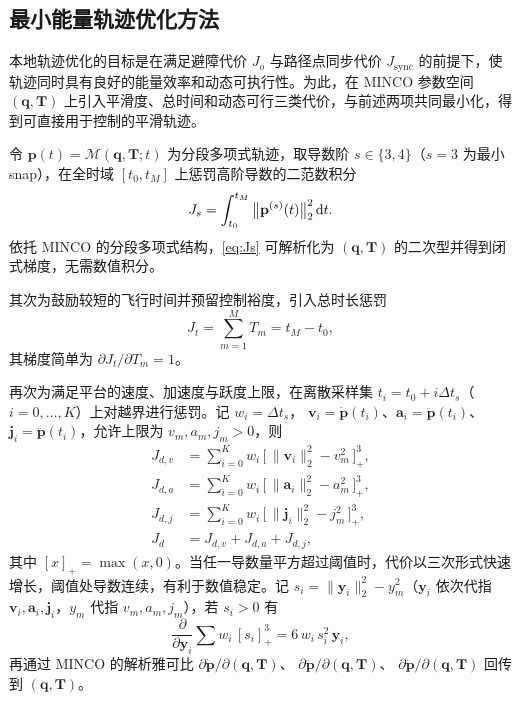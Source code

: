 \subsection{最小能量轨迹优化方法}

本地轨迹优化的目标是在满足避障代价 \(J_{o}\) 与路径点同步代价 \(J_{\mathrm{sync}}\) 的前提下，使轨迹同时具有良好的能量效率和动态可执行性。为此，在 MINCO 参数空间 \((\mathbf{q},\mathbf{T})\) 上引入平滑度、总时间和动态可行三类代价，与前述两项共同最小化，得到可直接用于控制的平滑轨迹。

令 \(\mathbf{p}(t)=\mathcal{M}(\mathbf{q},\mathbf{T};t)\) 为分段多项式轨迹，取导数阶 \(s\in\{3,4\}\)（\(s=3\) 为最小 snap），在全时域 \([t_0,t_M]\) 上惩罚高阶导数的二范数积分
\begin{equation}
\label{eq:Js}
J_s=\int_{t_0}^{t_M}\big\|\mathbf{p}^{(s)}(t)\big\|_2^{2}\,{\rm d}t.
\end{equation}
依托 MINCO 的分段多项式结构，\eqref{eq:Js} 可解析化为 \((\mathbf{q},\mathbf{T})\) 的二次型并得到闭式梯度，无需数值积分。

其次为鼓励较短的飞行时间并预留控制裕度，引入总时长惩罚
\begin{equation}
\label{eq:Jt}
J_t=\sum_{m=1}^{M}T_m=t_M-t_0 ,
\end{equation}
其梯度简单为 \(\partial J_t/\partial T_m=1\)。

再次为满足平台的速度、加速度与跃度上限，在离散采样集 \(t_i=t_0+i\Delta t_s\)（\(i=0,\dots,K\)）上对越界进行惩罚。记 \(w_i=\Delta t_s\)，
\(\mathbf{v}_i=\dot{\mathbf{p}}(t_i)\)、\(\mathbf{a}_i=\ddot{\mathbf{p}}(t_i)\)、\(\mathbf{j}_i=\dddot{\mathbf{p}}(t_i)\)，允许上限为 \(v_m,a_m,j_m>0\)，则
\begin{align}
\label{eq:Jdv}
J_{d,v}&=\sum_{i=0}^{K} w_i\,\Big[\,\|\mathbf{v}_i\|_2^{2}-v_m^{2}\,\Big]_{+}^{3},\\
\label{eq:Jda}
J_{d,a}&=\sum_{i=0}^{K} w_i\,\Big[\,\|\mathbf{a}_i\|_2^{2}-a_m^{2}\,\Big]_{+}^{3},\\
\label{eq:Jdj}
J_{d,j}&=\sum_{i=0}^{K} w_i\,\Big[\,\|\mathbf{j}_i\|_2^{2}-j_m^{2}\,\Big]_{+}^{3},\\
\label{eq:Jd_all}
J_d&=J_{d,v}+J_{d,a}+J_{d,j},
\end{align}
其中 \([x]_+=\max(x,0)\)。当任一导数量平方超过阈值时，代价以三次形式快速增长，阈值处导数连续，有利于数值稳定。记
\(s_i=\|\mathbf{y}_i\|_2^{2}-y_m^{2}\)（\(\mathbf{y}_i\) 依次代指 \(\mathbf{v}_i,\mathbf{a}_i,\mathbf{j}_i\)，\(y_m\) 代指 \(v_m,a_m,j_m\)），若 \(s_i>0\) 有
\begin{equation}
\label{eq:Jd_grad_y}
\frac{\partial}{\partial \mathbf{y}_i}\sum w_i\,[s_i]_{+}^{3}
=6\,w_i\,s_i^{2}\,\mathbf{y}_i ,
\end{equation}
再通过 MINCO 的解析雅可比
\(\partial \dot{\mathbf{p}}/\partial(\mathbf{q},\mathbf{T})\)、
\(\partial \ddot{\mathbf{p}}/\partial(\mathbf{q},\mathbf{T})\)、
\(\partial \dddot{\mathbf{p}}/\partial(\mathbf{q},\mathbf{T})\)
回传到 \((\mathbf{q},\mathbf{T})\)。


